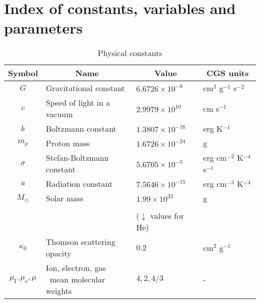 \documentclass[../main.tex]{subfiles}
\begin{document}
\renewcommand\theadalign{bc}
\renewcommand\theadfont{\bfseries}
\renewcommand\theadgape{\Gape[4pt]}
\renewcommand\cellgape{\Gape[4pt]}

\chapter{Index of constants, variables and parameters}\label{appendix_index}

\begin{table}[h]
    \centering
    \caption{Physical constants}
    \vspace*{0.3cm}
    \begin{tabular}{clll}
        \hline
        Symbol & \multicolumn{1}{c}{Name} & \multicolumn{1}{c}{Value} & \multicolumn{1}{c}{CGS units}\\\hline
        $G$ & Gravitational constant & $6.6726\times 10^{-8}$ & cm$^{3}$ g$^{-1}$ s$^{-2}$ \\
        
        $c$ & Speed of light in a vacuum & $2.9979\times 10^{10}$ & cm s$^{-1}$\\
        
        $k$ & Boltzmann constant & $1.3807\times10^{-16}$ & erg K$^{-1}$\\
        
        $m_p$ & Proton mass & $1.6726\times10^{-24}$ & g\\
        
        $\sigma$ & Stefan-Boltzmann constant & $5.6705\times10^{-5}$ & erg cm$^{-2}$ K$^{-4}$ s$^{-1}$   \\
         
        $a$ & Radiation constant & $7.5646\times 10^{-15}$ & erg cm$^{-3}$ K$^{-4}$\\
        
        $M_\odot$ & Solar mass & $1.99\times 10^{33}$ & g\\
        
          & & & \\
         &  &  ($\downarrow$ values for He) & \\
        $\kappa_0$ & Thomson scattering opacity & $0.2$ & cm$^2$ g$^{-1}$\\
        $\mu_\text{I},\mu_\text{e},\mu$ & \makecell[l]{Ion, electron, gas\\~mean molecular weights} & $4,2,4/3$ & -\\
    \end{tabular}
\end{table}
\end{document}
